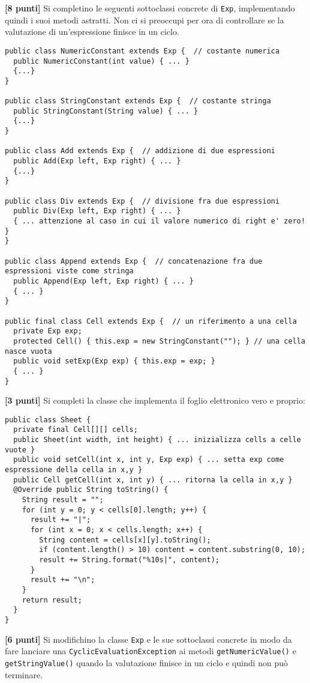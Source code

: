 \documentclass{article}[10pt]
\newcounter{esnu}
\newenvironment{esercizio}{\medskip \noindent {\bf Esercizio\addtocounter{esnu}{1} \arabic{esnu}}}{}
\begin{document}
\begin{esercizio}
\textbf{[8 punti]}
Si completino le seguenti sottoclassi concrete di \texttt{Exp}, implementando quindi i suoi metodi
astratti. Non ci si preoccupi per ora di controllare se la valutazione di un'espressione
finisce in un ciclo.
%
{\small
\begin{verbatim}
public class NumericConstant extends Exp {  // costante numerica
  public NumericConstant(int value) { ... }
  {...}
}

public class StringConstant extends Exp {  // costante stringa
  public StringConstant(String value) { ... }
  {...}
}

public class Add extends Exp {  // addizione di due espressioni
  public Add(Exp left, Exp right) { ... }
  {...}
}

public class Div extends Exp {  // divisione fra due espressioni
  public Div(Exp left, Exp right) { ... }
  { ... attenzione al caso in cui il valore numerico di right e' zero! }
}

public class Append extends Exp {  // concatenazione fra due espressioni viste come stringa
  public Append(Exp left, Exp right) { ... }
  { ... }
}

public final class Cell extends Exp {  // un riferimento a una cella
  private Exp exp;
  protected Cell() { this.exp = new StringConstant(""); } // una cella nasce vuota
  public void setExp(Exp exp) { this.exp = exp; }
  { ... }
}

\end{verbatim}
}

\end{esercizio}

\begin{esercizio}
\textbf{[3 punti]}
Si completi la classe che implementa il foglio elettronico vero e proprio:

{\small
\begin{verbatim}
public class Sheet {
  private final Cell[][] cells;
  public Sheet(int width, int height) { ... inizializza cells a celle vuote }
  public void setCell(int x, int y, Exp exp) { ... setta exp come espressione della cella in x,y }
  public Cell getCell(int x, int y) { ... ritorna la cella in x,y }
  @Override public String toString() {
    String result = "";
    for (int y = 0; y < cells[0].length; y++) {
      result += "|";
      for (int x = 0; x < cells.length; x++) {
        String content = cells[x][y].toString();
        if (content.length() > 10) content = content.substring(0, 10);
        result += String.format("%10s|", content);
      }
      result += "\n";
    }
    return result;
  }
}
\end{verbatim}
}

\end{esercizio}

\begin{esercizio}
\textbf{[6 punti]}
Si modifichino la classe \texttt{Exp} e le sue sottoclassi concrete in modo da fare lanciare
una \texttt{CyclicEvaluationException} ai metodi \texttt{getNumericValue()} e
\texttt{getStringValue()} quando la valutazione finisce in un ciclo e quindi non pu\`o terminare.
\end{esercizio}
\end{document}
